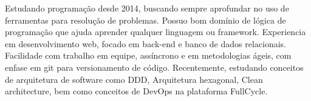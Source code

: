 \begin{cvletter}
  Estudando programação desde 2014, buscando sempre aprofundar no uso de ferramentas para resolução de problemas. Possuo bom domínio de lógica de programação que ajuda aprender qualquer linguagem ou framework. Experiencia em desenvolvimento web, focado em back-end e banco de dados relacionais. Facilidade com trabalho em equipe, assíncrono e em metodologias ágeis, com enfase em git para versionamento de código. Recentemente, estudando conceitos de arquitetura de software como DDD, Arquitetura hexagonal, Clean architecture, bem como conceitos de DevOps na plataforma FullCycle.

\end{cvletter}